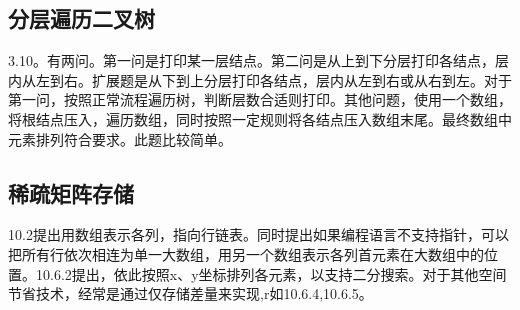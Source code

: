 \subsection{分层遍历二叉树}
\cite{bop}3.10。有两问。第一问是打印某一层结点。第二问是从上到下分层打印各结点，层内从左到右。扩展题是从下到上分层打印各结点，层内从左到右或从右到左。对于第一问，按照正常流程遍历树，判断层数合适则打印。其他问题，使用一个数组，将根结点压入，遍历数组，同时按照一定规则将各结点压入数组末尾。最终数组中元素排列符合要求。此题比较简单。



\subsection{稀疏矩阵存储}
\cite{pp}10.2提出用数组表示各列，指向行链表。同时提出如果编程语言不支持指针，可以把所有行依次相连为单一大数组，用另一个数组表示各列首元素在大数组中的位置。\cite{pp}10.6.2提出，依此按照x、y坐标排列各元素，以支持二分搜索。对于其他空间节省技术，经常是通过仅存储差量来实现,r如\cite{pp}10.6.4,10.6.5。
\label{problem:sparseMatrix}


